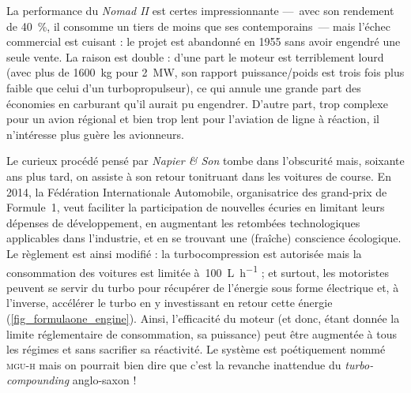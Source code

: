 La performance du \textit{Nomad II} est certes impressionnante —\ avec son rendement de \SI{40}{\percent}, il consomme un tiers de moins que ses contemporains\ — mais l’échec commercial est cuisant : le projet est abandonné en 1955 sans avoir engendré une seule vente. La raison est double : d’une part le moteur est terriblement lourd (avec plus de \SI{1600}{\kilogram} pour \SI{2}{\mega\watt}, son rapport puissance/poids est trois fois plus faible que celui d’un turbopropulseur), ce qui annule une grande part des économies en carburant qu’il aurait pu engendrer. D’autre part, trop complexe pour un avion régional et bien trop lent pour l’aviation de ligne à réaction, il n’intéresse plus guère les avionneurs.

Le curieux procédé pensé par \textit{Napier \& Son} tombe dans l’obscurité mais, soixante ans plus tard, on assiste à son retour tonitruant dans les voitures de course. En 2014, la Fédération Internationale Automobile, organisatrice des grand-prix de Formule~1, veut faciliter la participation de nouvelles écuries en limitant leurs dépenses de développement, en augmentant les retombées technologiques applicables dans l’industrie, et en se trouvant une (fraîche) conscience écologique. Le règlement est ainsi modifié : la turbocompression est autorisée mais la consommation des voitures est limitée à~\SI[per-mode=symbol]{100}{\liter\per\hour} ; et surtout, les motoristes peuvent se servir du turbo pour récupérer de l’énergie sous forme électrique et, à l’inverse, accélérer le turbo en y investissant en retour cette énergie (\cref{fig_formulaone_engine}). Ainsi, l’efficacité du moteur (et donc, étant donnée la limite réglementaire de consommation, sa puissance) peut être augmentée à tous les régimes et sans sacrifier sa réactivité. Le système est poétiquement nommé \textsc{mgu-h} mais on pourrait bien dire que c’est la revanche inattendue du \textit{turbo-compounding} anglo-saxon !

